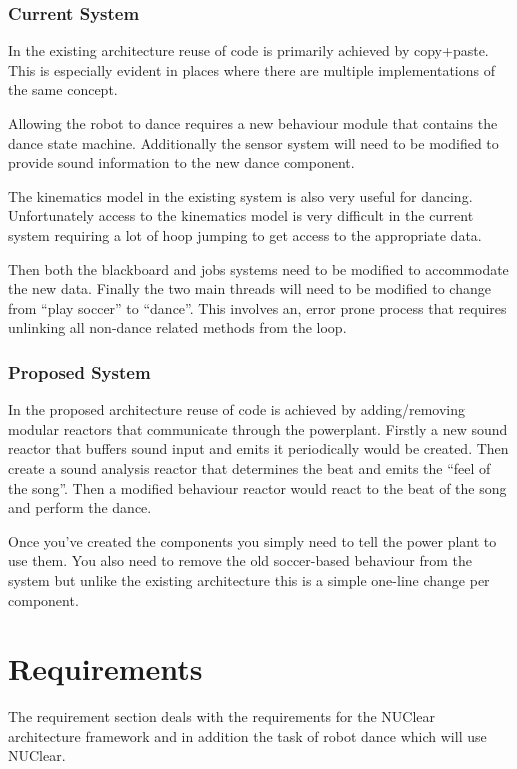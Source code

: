 \documentclass[english,12pt]{scrartcl}
\begin{document}
			\subsubsection{Current System}
				In the existing architecture reuse of code is primarily achieved by copy+paste. This is 
				especially evident in places where there are multiple implementations of the same concept.
				
				Allowing the robot to dance requires a new behaviour module that contains the dance state
				machine. Additionally the sensor system will need to be modified to provide sound information
				to the new dance component. 
				
				The kinematics model in the existing system is also very useful for dancing. Unfortunately access
				to the kinematics model is very difficult in the current system requiring a lot of hoop jumping to
				get access to the appropriate data. 

				Then both the blackboard and jobs systems need to be modified to accommodate the new data. 
				Finally the two main threads will need to be modified to change from ``play soccer'' to ``dance''. 
				This involves an, error prone process that requires unlinking all non-dance related methods from the loop.
				
			\subsubsection{Proposed System}
				In the proposed architecture reuse of code is achieved by adding/removing modular \glspl{reactor} that communicate through the \gls{powerplant}.
				Firstly a new sound \gls{reactor} that buffers sound input and emits it periodically would be created.
				Then create a sound analysis \gls{reactor} that determines the beat and emits the ``feel of the song''.
				Then a modified behaviour \gls{reactor} would react to the beat of the song and perform the dance.
				
				Once you've created the components you simply need to tell the power plant to use them.
				You also need to remove the old soccer-based behaviour from the system but unlike the existing architecture this is a simple one-line change per component.

	\section{Requirements}
	The requirement section deals with the requirements for the NUClear architecture framework and in addition the task of robot dance which will use NUClear.
		
\end{document}
